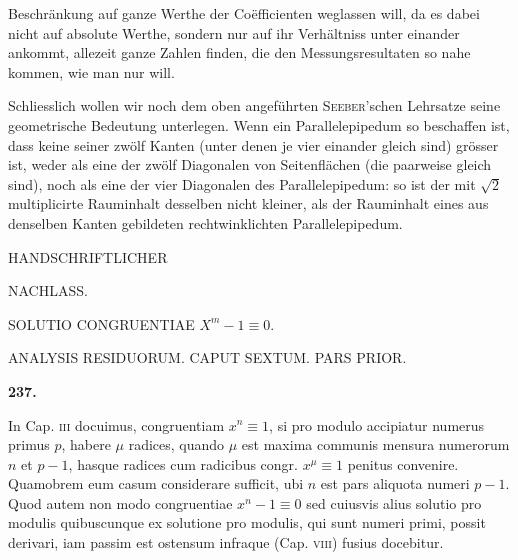 %
Beschränkung auf ganze Werthe der Coëfficienten weglassen will, da es dabei nicht auf absolute Werthe, sondern nur auf ihr Verhältniss unter einander ankommt, allezeit ganze Zahlen finden, die den Messungsresultaten so nahe kommen, wie man nur will.

Schliesslich wollen wir noch dem oben angeführten \textsc{Seeber}'schen Lehrsatze seine geometrische Bedeutung unterlegen. Wenn ein Parallelepipedum so beschaffen ist, dass keine seiner zwölf Kanten (unter denen je vier einander gleich sind) grösser ist, weder als eine der zwölf Diagonalen von Seitenflächen (die paarweise gleich sind), noch als eine der vier Diagonalen des Parallelepipedum: so ist der mit $\surd2$ multiplicirte Rauminhalt desselben nicht kleiner, als der Rauminhalt eines aus denselben Kanten gebildeten rechtwinklichten Parallelepipedum.

\clearpage
{}%
\renewcommand{\BookRunningTitle}{Handschriftlicher Nachlass}
\thispagestyle{empty}
\vspace*{.25\textheight}
\begin{center}
{\Large HANDSCHRIFTLICHER}\par\vspace{2.8cm}
{\Huge NACHLASS.}
\end{center}
\vfill

\clearpage
{}%
\renewcommand{\BookRunningTitle}{Nachlass. Analysis residuorum}
\begin{center}
{\large SOLUTIO CONGRUENTIAE $X^m-1\equiv0$.}\par\medskip
ANALYSIS RESIDUORUM. CAPUT SEXTUM. PARS PRIOR.
\end{center}
\renewcommand{\Article}[1]{\par\medskip\Needspace{4\baselineskip}\pdfbookmark[1]{Art. #1}{analysis-residuorum-art-#1}\centerline{\textbf{#1.}}\nobreak\smallskip}
\Article{237}
In Cap. \textsc{iii} docuimus, congruentiam $x^n\equiv1$, si pro modulo accipiatur numerus primus $p$, habere $\mu$ radices, quando $\mu$ est maxima communis mensura numerorum $n$ et $p-1$, hasque radices cum radicibus congr. $x^\mu\equiv1$ penitus convenire. Quamobrem eum casum considerare sufficit, ubi $n$ est pars aliquota numeri $p-1$. Quod autem non modo congruentiae $x^n-1\equiv0$ sed cuiusvis alius solutio pro modulis quibuscunque ex solutione pro modulis, qui sunt numeri primi, possit derivari, iam passim est ostensum infraque (Cap. \textsc{viii}) fusius docebitur.

